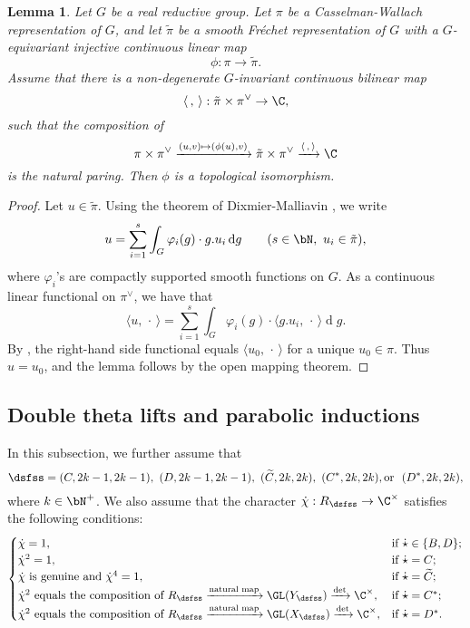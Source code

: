 \documentclass[12pt,a4paper]{amsart}
\newcommand{\od}{\operatorname{d}}
\newcommand{\la}{\langle}
\newcommand{\ra}{\rangle}
\newcommand{\be}{\begin {equation}}
\newcommand{\ee}{\end {equation}}
\numberwithin{equation}{section}
\newtheorem{lem}[thm]{Lemma}
\theoremstyle{remark}
\begin{document}
\begin{lem}\label{imb2}
Let $G$ be a real reductive group. Let $\pi$ be a Casselman-Wallach representation of $G$, and let $\tilde \pi$ be a smooth Fr\'echet representation of $G$ with a $G$-equivariant injective continuous linear map
\[
  \phi: \pi\rightarrow \tilde \pi.
\]
Assume that  there is a non-degenerate $G$-invariant continuous bilinear map
\[
\la\,,\,\ra: \tilde \pi\times \pi^\vee\rightarrow \C,
\]
such that the composition of
\[
 \pi\times \pi^\vee\xrightarrow{(u,v)\mapsto (\phi(u),v)} \tilde \pi\times \pi^\vee\xrightarrow{\la\,,\,\ra} \C 
\]
is the natural paring. Then $\phi$ is a topological isomorphism. 
\end{lem}
\begin{proof}
 Let $u\in \tilde \pi$. 
 Using the theorem of Dixmier-Malliavin \cite[Theorem 3.3]{DM}, we write
 \[
   u=\sum_{i=1}^{s} \int_G \varphi_i(g)  \cdot g. u_i\od\! g \qquad (s\in \bN, \ u_i\in\tilde \pi),
 \]
 where $\varphi_i$'s are compactly supported smooth functions on $G$.  As a continuous linear functional on $\pi^\vee$, we have that
  \[
   \la u,\, \cdot\, \ra=\sum_{i=1}^{s} \int_G \varphi_i(g)  \cdot \la g. u_i, \,\cdot\,\ra \od\! g.
 \]
By \cite[Lemma 3.5]{SZ1},  the right-hand side  functional  equals  $\la u_0, \,\cdot\,\ra$ for a unique $u_0\in \pi$. Thus $u=u_0$, and the lemma follows by the open mapping theorem. 

\end{proof}

\subsection{Double theta lifts and parabolic inductions}
In this subsection, we further assume that 
\[
 \dsfss= (C, 2k-1, 2k-1), \ (D, 2k-1, 2k-1), \ (\widetilde C, 2k, 2k), \ (C^*, 2k, 2k), \textrm{or }\ (D^*, 2k, 2k),
\]
where $k\in \bN^+$. 
We also assume that the character $\dot \chi: R_{\dsfss}\rightarrow \C^\times $ 
satisfies  the following conditions:
\be\label{chid}
\begin{cases}
  \dot \chi=1,\quad   &\textrm{if }\dot \star\in \{B,D\};\\
 \dot \chi^2=1,  & \textrm{if $\dot \star=C$;}\\
 \dot \chi \textrm{ is genuine and $\dot \chi^4=1$,}& \textrm{if $\dot \star=\widetilde C$};\\
  \dot \chi^2\textrm{ equals the composition of $R_\dsfss\xrightarrow{\textrm{natural map}} \GL(Y_\dsfss)\xrightarrow{\det}\C^\times$},  & \textrm{if $\dot \star=C^*$;}\\
   \dot \chi^2\textrm{ equals the composition of $R_\dsfss\xrightarrow{\textrm{natural map}} \GL(X_\dsfss)\xrightarrow{\det}\C^\times$},  & \textrm{if $\dot \star=D^*$.}
\end{cases}
\ee
\end{document}
